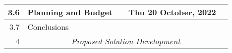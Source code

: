 \documentclass{standalone}
\begin{document}
\begin{tabular}{|r|llll|}
    3.6                                                       & \multicolumn{1}{l|}{Planning and Budget}                        & \multicolumn{1}{l|}{}                                          & \multicolumn{1}{l|}{Thu 20 October, 2022}                   &                                                              \\ \hline
    3.7                                                       & \multicolumn{1}{l|}{Conclusions}                                & \multicolumn{1}{l|}{}                                          & \multicolumn{1}{l|}{}                                       &                                                              \\ \hline
    4                                                         & \multicolumn{4}{c|}{\textit{Proposed Solution Development}}                                                                                                                                                                                                   \\ \hline
\end{tabular}
\end{document}
